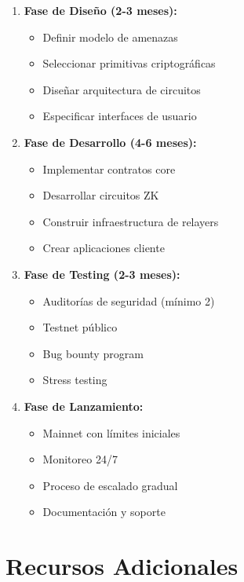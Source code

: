 \documentclass[11pt,a4paper,twoside]{book}
\theoremstyle{definition}
\theoremstyle{remark}
\begin{document}
\begin{enumerate}
    \item \textbf{Fase de Diseño (2-3 meses):}
    \begin{itemize}
        \item Definir modelo de amenazas
        \item Seleccionar primitivas criptográficas
        \item Diseñar arquitectura de circuitos
        \item Especificar interfaces de usuario
    \end{itemize}
    
    \item \textbf{Fase de Desarrollo (4-6 meses):}
    \begin{itemize}
        \item Implementar contratos core
        \item Desarrollar circuitos ZK
        \item Construir infraestructura de relayers
        \item Crear aplicaciones cliente
    \end{itemize}
    
    \item \textbf{Fase de Testing (2-3 meses):}
    \begin{itemize}
        \item Auditorías de seguridad (mínimo 2)
        \item Testnet público
        \item Bug bounty program
        \item Stress testing
    \end{itemize}
    
    \item \textbf{Fase de Lanzamiento:}
    \begin{itemize}
        \item Mainnet con límites iniciales
        \item Monitoreo 24/7
        \item Proceso de escalado gradual
        \item Documentación y soporte
    \end{itemize}
\end{enumerate}

\section*{Recursos Adicionales}
\end{document}
